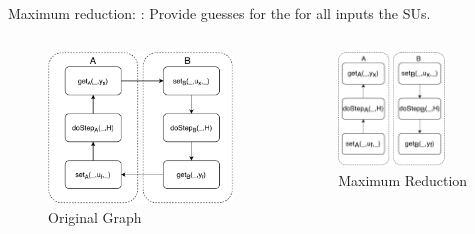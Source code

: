 \documentclass{beamer}
\begin{document}
\begin{frame}{Maximum reduction:}
    : Provide guesses for the for all inputs the SUs. 
    \begin{columns}[T] %
        \begin{column}{.48\textwidth}
            \begin{figure}    
                \includegraphics[width=0.98\textwidth]{images/reactive_step_graph.pdf}
                \caption{Original Graph}
            \end{figure}
    \end{column}%
    \hfill%
    \begin{column}{.48\textwidth}
        \begin{figure}    
            \includegraphics[width=0.8\textwidth]{images/jacobian_reduced_graph.pdf}
            \caption{Maximum Reduction}
        \end{figure}
    \end{column}%
    \end{columns}


\end{frame}
\end{document}
